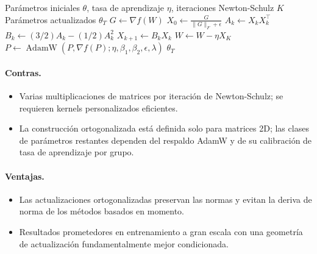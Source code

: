 \begin{algorithm}[H]
\caption{Muon (Ortogonalización de Newton-Schulz)}
\label{alg:muon}
\begin{algorithmic}[1]
\Require Parámetros iniciales $\theta$, tasa de aprendizaje $\eta$, iteraciones Newton-Schulz $K$
\Ensure Parámetros actualizados $\theta_T$
        \State $G \gets \nabla f(W)$ 
        \State $X_0 \gets \frac{G}{\|G\|_F + \epsilon}$ 
            \State $A_k \gets X_k X_k^\top$ 
            \State $B_k \gets (3/2) A_k - (1/2) A_k^2$ 
            \State $X_{k+1} \gets B_k X_k$ 
        \EndFor
        \State $W \gets W - \eta X_K$ 
    \Else
        \State $P \gets \operatorname{AdamW}(P, \nabla f(P); \eta, \beta_1, \beta_2, \epsilon, \lambda)$ 
    \EndIf
\EndFor
\Return $\theta_T$
\end{algorithmic}
\end{algorithm}

\paragraph{Contras.}
\begin{itemize}[leftmargin=*]
\item Varias multiplicaciones de matrices por iteración de Newton-Schulz; se requieren kernels personalizados eficientes.
\item La construcción ortogonalizada está definida solo para matrices 2D; las clases de parámetros restantes dependen del respaldo AdamW y de su calibración de tasa de aprendizaje por grupo.
\end{itemize}

\paragraph{Ventajas.}
\begin{itemize}[leftmargin=*]
\item Las actualizaciones ortogonalizadas preservan las normas y evitan la deriva de norma de los métodos basados en momento.
\item Resultados prometedores en entrenamiento a gran escala con una geometría de actualización fundamentalmente mejor condicionada.
\end{itemize}

